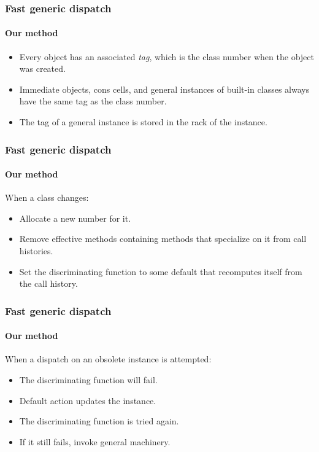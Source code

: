 \documentclass[12pt]{beamer}
\begin{document}
\begin{frame}
  \frametitle{Fast generic dispatch}
  \framesubtitle{Our method}

  \begin{itemize}
  \item Every object has an associated \emph{tag}, which is the class
    number when the object was created.
  \item Immediate objects, cons cells, and general instances of
    built-in classes always have the same tag as the class number.
  \item The tag of a general instance is stored in the rack of the
    instance. 
  \end{itemize}

\end{frame}
\begin{frame}
  \frametitle{Fast generic dispatch}
  \framesubtitle{Our method}

  When a class changes:

  \begin{itemize}
  \item Allocate a new number for it.
  \item Remove effective methods containing methods that specialize on
    it from call histories.
  \item Set the discriminating function to some default that
    recomputes itself from the call history.
  \end{itemize}

\end{frame}
\begin{frame}
  \frametitle{Fast generic dispatch}
  \framesubtitle{Our method}

  When a dispatch on an obsolete instance is attempted:

  \begin{itemize}
  \item The discriminating function will fail.
  \item Default action updates the instance. 
  \item The discriminating function is tried again.
  \item If it still fails, invoke general machinery.
  \end{itemize}

\end{frame}
\end{document}
